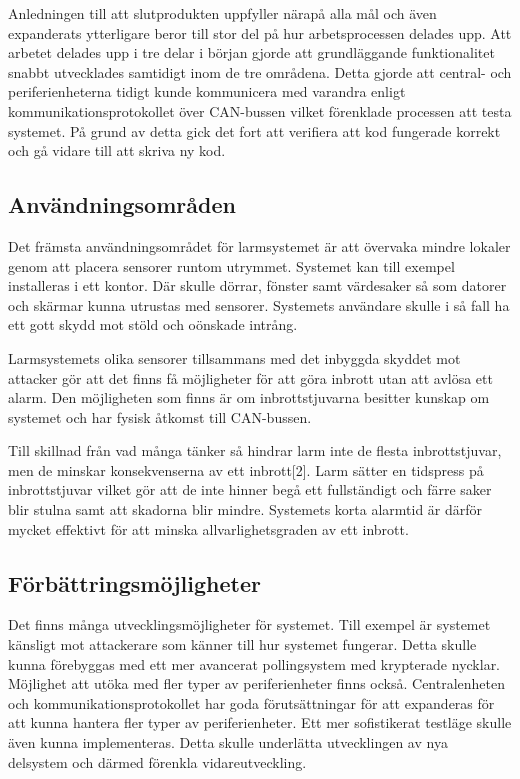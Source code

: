\documentclass[a4paper]{article}
\newcommand{\todo}[1]{\marginpar{TODO: #1}\vspace{1cm}}
\begin{document}
Anledningen till att slutprodukten uppfyller närapå alla mål och även expanderats ytterligare beror till stor del på hur arbetsprocessen delades upp.
Att arbetet delades upp i tre delar i början gjorde att grundläggande funktionalitet snabbt utvecklades samtidigt inom de tre områdena.
Detta gjorde att central- och periferienheterna tidigt kunde kommunicera med varandra enligt kommunikationsprotokollet över CAN-bussen vilket förenklade processen att testa systemet.
På grund av detta gick det fort att verifiera att kod fungerade korrekt och gå vidare till att skriva ny kod.

\subsection{Användningsområden}
Det främsta användningsområdet för larmsystemet är att övervaka mindre lokaler genom att placera sensorer runtom utrymmet.
Systemet kan till exempel installeras i ett kontor.
Där skulle dörrar, fönster samt värdesaker så som datorer och skärmar kunna utrustas med sensorer.
Systemets användare skulle i så fall ha ett gott skydd mot stöld och oönskade intrång.

Larmsystemets olika sensorer tillsammans med det inbyggda skyddet mot attacker gör att det finns få möjligheter för att göra inbrott utan att avlösa ett alarm.
Den möjligheten som finns är om inbrottstjuvarna besitter kunskap om systemet och har fysisk åtkomst till CAN-bussen.

Till skillnad från vad många tänker så hindrar larm inte de flesta inbrottstjuvar, men de minskar konsekvenserna av ett inbrott[2]. Larm sätter en tidspress på inbrottstjuvar vilket gör att de inte hinner begå ett fullständigt och färre saker blir stulna samt att skadorna blir mindre. Systemets korta alarmtid är därför mycket effektivt för att minska allvarlighetsgraden av ett inbrott.

\subsection{Förbättringsmöjligheter}
Det finns många utvecklingsmöjligheter för systemet.
Till exempel är systemet känsligt mot attackerare som känner till hur systemet fungerar.
Detta skulle kunna förebyggas med ett mer avancerat pollingsystem med krypterade nycklar.
Möjlighet att utöka med fler typer av periferienheter finns också.
Centralenheten och kommunikationsprotokollet har goda förutsättningar för att expanderas för att kunna hantera fler typer av periferienheter.
Ett mer sofistikerat testläge skulle även kunna implementeras.
Detta skulle underlätta utvecklingen av nya delsystem och därmed förenkla vidareutveckling.
\end{document}
